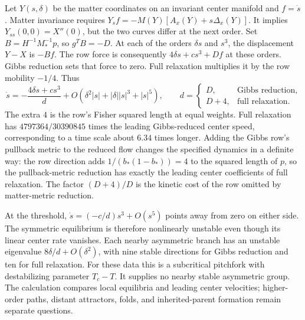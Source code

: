 Let $Y(s,\delta)$ be the matter coordinates on an invariant center manifold and $f=\dot s$. Matter invariance requires $Y_s f=-M(Y)[A_x(Y)+s\Delta_x(Y)]$. It implies $Y_{ss}(0,0)=X''(0)$, but the two curves differ at the next order. Set $B=H^{-1}M_*^{-1}p$, so $g^TB=-D$. At each of the orders $\delta s$ and $s^3$, the displacement $Y-X$ is $-Bf$. The row force is consequently $4\delta s+c s^3+Df$ at these orders. Gibbs reduction sets that force to zero. Full relaxation multiplies it by the row mobility $-1/4$. Thus
\begin{equation}
 \dot s=-\frac{4\delta s+c s^3}{d}
       +O(\delta^2|s|+|\delta||s|^3+|s|^5),\qquad
 d=\begin{cases}D,&\text{Gibbs reduction},\\D+4,&\text{full relaxation}.\end{cases}
 \label{c18:critical-dynamics}
\end{equation}
The extra $4$ is the row's Fisher squared length at equal weights. Full relaxation has $4797364/30390845$ times the leading Gibbs-reduced center speed, corresponding to a time scale about $6.34$ times longer. Adding the Gibbs row's pullback metric to the reduced flow changes the specified dynamics in a definite way: the row direction adds $1/(b_*(1-b_*))=4$ to the squared length of $p$, so the pullback-metric reduction has exactly the leading center coefficients of full relaxation. The factor $(D+4)/D$ is the kinetic cost of the row omitted by matter-metric reduction.

At the threshold, $\dot s=(-c/d)s^3+O(s^5)$ points away from zero on either side. The symmetric equilibrium is therefore nonlinearly unstable even though its linear center rate vanishes. Each nearby asymmetric branch has an unstable eigenvalue $8\delta/d+O(\delta^2)$, with nine stable directions for Gibbs reduction and ten for full relaxation. For these data this is a subcritical pitchfork with destabilizing parameter $T_c-T$. It supplies no nearby stable asymmetric group. The calculation compares local equilibria and leading center velocities; higher-order paths, distant attractors, folds, and inherited-parent formation remain separate questions.
